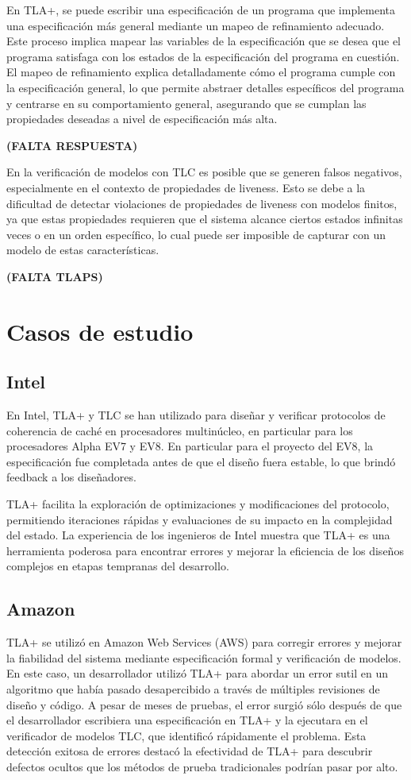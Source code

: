 \documentclass[runningheads]{llncs}
\begin{document}
En TLA+, se puede escribir una especificación de un programa que implementa una especificación más general mediante un mapeo de refinamiento adecuado. Este proceso implica mapear las variables de la especificación que se desea que el programa satisfaga con los estados de la especificación del programa en cuestión. El mapeo de refinamiento explica detalladamente cómo el programa cumple con la especificación general, lo que permite abstraer detalles específicos del programa y centrarse en su comportamiento general, asegurando que se cumplan las propiedades deseadas a nivel de especificación más alta.

\textbf{(FALTA RESPUESTA)}

En la verificación de modelos con TLC es posible que se generen falsos negativos, especialmente en el contexto de propiedades de liveness. Esto se debe a la dificultad de detectar violaciones de propiedades de liveness con modelos finitos, ya que estas propiedades requieren que el sistema alcance ciertos estados infinitas veces o en un orden específico, lo cual puede ser imposible de capturar con un modelo de estas características.

\textbf{(FALTA TLAPS)}

\section{Casos de estudio}
\subsection{Intel}
En Intel, TLA+ y TLC se han utilizado para diseñar y verificar protocolos de coherencia de caché en procesadores multinúcleo, en particular para los procesadores Alpha EV7 y EV8. En particular para el proyecto del EV8, la especificación fue completada antes de que el diseño fuera estable, lo que brindó feedback a los diseñadores.

TLA+ facilita la exploración de optimizaciones y modificaciones del protocolo, permitiendo iteraciones rápidas y evaluaciones de su impacto en la complejidad del estado. La experiencia de los ingenieros de Intel muestra que TLA+ es una herramienta poderosa para encontrar errores y mejorar la eficiencia de los diseños complejos en etapas tempranas del desarrollo. \cite{tla}

\subsection{Amazon}
TLA+ se utilizó en Amazon Web Services (AWS) \cite{amazon} para corregir errores y mejorar la fiabilidad del sistema mediante especificación formal y verificación de modelos. En este caso, un desarrollador utilizó TLA+ para abordar un error sutil en un algoritmo que había pasado desapercibido a través de múltiples revisiones de diseño y código. A pesar de meses de pruebas, el error surgió sólo después de que el desarrollador escribiera una especificación en TLA+ y la ejecutara en el verificador de modelos TLC, que identificó rápidamente el problema. Esta detección exitosa de errores destacó la efectividad de TLA+ para descubrir defectos ocultos que los métodos de prueba tradicionales podrían pasar por alto.
\end{document}
